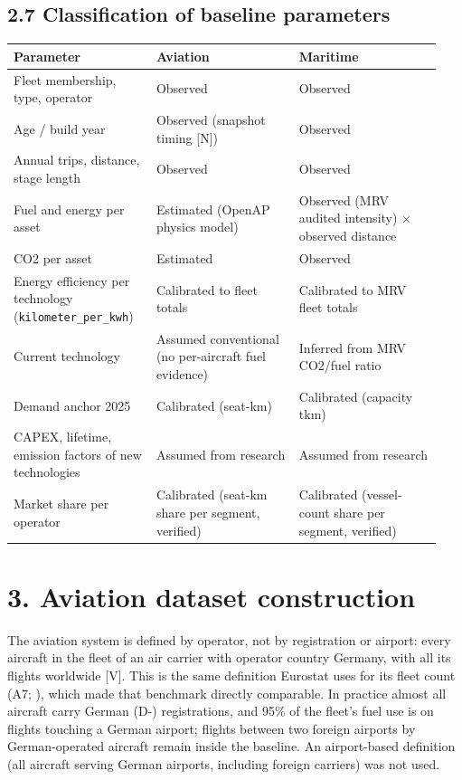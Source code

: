\documentclass[11pt,a4paper]{article}
\begin{document}
\subsection*{2.7 Classification of baseline parameters}

{\small\setlength{\tabcolsep}{3pt}
\begin{longtable}{>{\raggedright\arraybackslash}p{0.315\linewidth}>{\raggedright\arraybackslash}p{0.315\linewidth}>{\raggedright\arraybackslash}p{0.315\linewidth}}
\toprule
\textbf{Parameter} & \textbf{Aviation} & \textbf{Maritime} \tabularnewline
\midrule
\endhead
Fleet membership, type, operator & Observed & Observed \tabularnewline
Age / build year & Observed (snapshot timing [N]) & Observed \tabularnewline
Annual trips, distance, stage length & Observed & Observed \tabularnewline
Fuel and energy per asset & Estimated (OpenAP physics model) & Observed (MRV audited intensity) × observed distance \tabularnewline
CO2 per asset & Estimated & Observed \tabularnewline
Energy efficiency per technology (\texttt{kilometer\_\allowbreak{}per\_\allowbreak{}kwh}) & Calibrated to fleet totals & Calibrated to MRV fleet totals \tabularnewline
Current technology & Assumed conventional (no per-aircraft fuel evidence) & Inferred from MRV CO2/fuel ratio \tabularnewline
Demand anchor 2025 & Calibrated (seat-km) & Calibrated (capacity tkm) \tabularnewline
CAPEX, lifetime, emission factors of new technologies & Assumed from research & Assumed from research \tabularnewline
Market share per operator & Calibrated (seat-km share per segment, verified) & Calibrated (vessel-count share per segment, verified) \tabularnewline
\bottomrule
\end{longtable}}

\section*{3. Aviation dataset construction}

The aviation system is defined by operator, not by registration or airport: every aircraft in the fleet of an air carrier with operator country Germany, with all its flights worldwide [V]. This is the same definition Eurostat uses for its fleet count (A7; \citealp{eurostat2025}), which made that benchmark directly comparable. In practice almost all aircraft carry German (D-) registrations, and 95\% of the fleet's fuel use is on flights touching a German airport; flights between two foreign airports by German-operated aircraft remain inside the baseline. An airport-based definition (all aircraft serving German airports, including foreign carriers) was not used.
\end{document}
